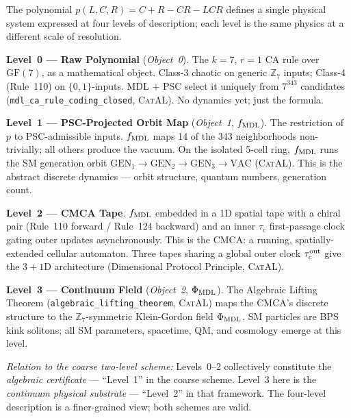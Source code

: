\documentclass[11pt,a4paper]{article}
\newcommand{\lean}[1]{\texttt{#1}}
\newcommand{\PhiMDL}{\Phi_{\rm MDL}}
\newcommand{\ZS}{\mathbb{Z}_7}
\newcommand{\poly}{p}
\newcommand{\fMDL}{f_{\rm MDL}}
\newcommand{\CatAL}{\textsc{CatAL}}
\begin{document}
\begin{tcolorbox}[colback=boxblue,colframe=blue!40!black,
  title={The GTE Computational Architecture: One System, Four Levels},
  breakable]
\small
The polynomial $\poly(L,C,R) = C+R-CR-LCR$ defines a single physical system
expressed at four levels of description; each level is the same physics at a
different scale of resolution.

\medskip
\noindent\textbf{Level~0 --- Raw Polynomial} (\emph{Object~0}).
The $k{=}7$, $r{=}1$ CA rule over $\mathrm{GF}(7)$, as a mathematical object.
Class-3 chaotic on generic $\ZS$ inputs; Class-4 (Rule~110) on $\{0,1\}$-inputs.
MDL $+$ PSC select it uniquely from $7^{343}$ candidates
(\lean{mdl\_ca\_rule\_coding\_closed}, \CatAL).
No dynamics yet; just the formula.

\medskip
\noindent\textbf{Level~1 --- PSC-Projected Orbit Map} (\emph{Object~1}, $\fMDL$).
The restriction of $\poly$ to PSC-admissible inputs.
$\fMDL$ maps 14 of the 343 neighborhoods non-trivially; all others produce the
vacuum.
On the isolated 5-cell ring, $\fMDL$ runs the SM generation orbit
$\mathrm{GEN}_1\to\mathrm{GEN}_2\to\mathrm{GEN}_3\to\mathrm{VAC}$ (\CatAL).
This is the abstract discrete dynamics --- orbit structure, quantum numbers,
generation count.

\medskip
\noindent\textbf{Level~2 --- CMCA Tape}.
$\fMDL$ embedded in a 1D spatial tape with a chiral pair
(Rule~110 forward / Rule~124 backward) and an inner $\tau_c$
first-passage clock gating outer updates asynchronously.
This is the CMCA: a running, spatially-extended cellular automaton.
Three tapes sharing a global outer clock $\tau_c^{\rm out}$ give the
$3{+}1$D architecture (Dimensional Protocol Principle, \CatAL).

\medskip
\noindent\textbf{Level~3 --- Continuum Field} (\emph{Object~2}, $\PhiMDL$).
The Algebraic Lifting Theorem (\lean{algebraic\_lifting\_theorem}, \CatAL) maps
the CMCA's discrete structure to the $\ZS$-symmetric Klein-Gordon field $\PhiMDL$.
SM particles are BPS kink solitons; all SM parameters, spacetime, QM,
and cosmology emerge at this level.

\medskip
\noindent\textit{Relation to the coarse two-level scheme:}
Levels~0--2 collectively constitute the \emph{algebraic certificate} ---
``Level~1'' in the coarse scheme.
Level~3 here is the \emph{continuum physical substrate} --- ``Level~2'' in
that framework.
The four-level description is a finer-grained view; both schemes are valid.
\end{tcolorbox}
\end{document}
